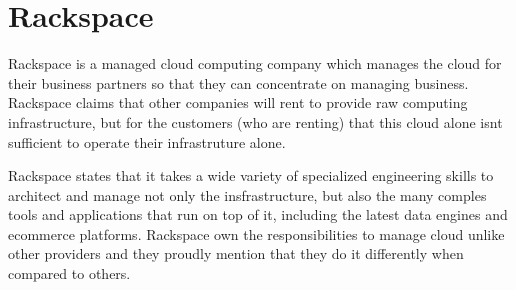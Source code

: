 \section{Rackspace}
Rackspace is a managed cloud computing company which manages the cloud for their
business partners so that they can concentrate on managing business. Rackspace
claims that other companies will rent to provide raw computing infrastructure,
but for the customers (who are renting) that this cloud alone isnt sufficient to
operate their infrastruture alone.

Rackspace states that it takes a wide variety of specialized engineering skills
to architect and manage not only the insfrastructure, but also the many comples
tools and applications that run on top of it, including the latest data engines
and ecommerce platforms. Rackspace own the responsibilities to manage cloud
unlike other providers and they proudly mention that they do it differently when
compared to others. \cite{Rackspace}

 